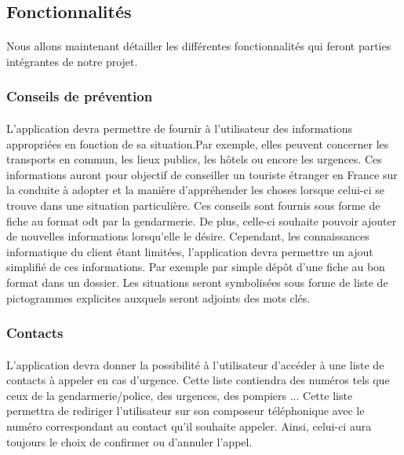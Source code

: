 \subsection{Fonctionnalités}

\paragraph{}
	Nous allons maintenant détailler les différentes fonctionnalités qui feront parties intégrantes de notre projet.
	
\subsubsection{Conseils de prévention}
	\paragraph{}
		L'application devra permettre de fournir à l'utilisateur des informations appropriées en fonction de sa situation.Par exemple, elles peuvent concerner les transports en commun, les lieux publics, les hôtels ou encore les urgences. Ces informations auront pour objectif de conseiller un touriste étranger en France sur la conduite à adopter et la manière d'appréhender les choses lorsque celui-ci se trouve dans une situation particulière. Ces conseils sont fournis sous forme de fiche au format odt par la gendarmerie. De plus, celle-ci souhaite pouvoir ajouter de nouvelles informations lorsqu'elle le désire. Cependant, les connaissances informatique du client étant limitées, l'application devra permettre un ajout simplifié de ces informations. Par exemple par simple dépôt d'une fiche au bon format dans un dossier. Les situations seront symbolisées sous forme de liste de pictogrammes explicites auxquels seront adjoints des mots clés.

\subsubsection{Contacts}
	\paragraph{}
			L'application devra donner la possibilité à l'utilisateur d'accéder à une liste de contacts à appeler en cas d'urgence. Cette liste contiendra des numéros tels que ceux de la gendarmerie/police, des urgences, des pompiers ... Cette liste permettra de rediriger l'utilisateur sur son composeur téléphonique avec le numéro correspondant au contact qu'il souhaite appeler. Ainsi, celui-ci aura toujours le choix de confirmer ou d'annuler l'appel.
			
